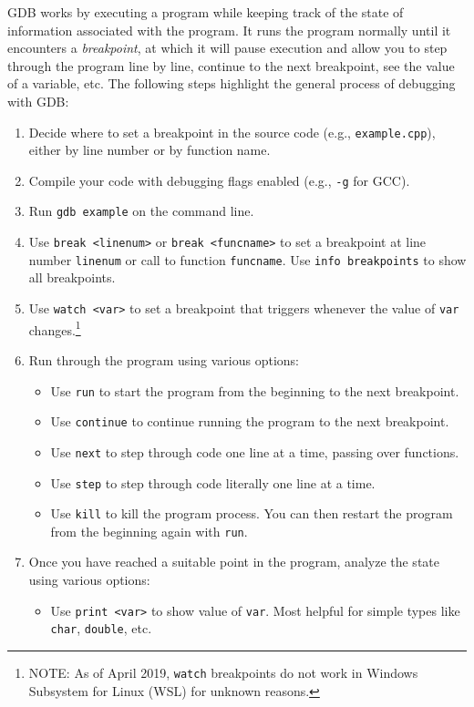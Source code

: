 \documentclass[12pt]{article}
\begin{document}
GDB works by executing a program while keeping track of the state of information associated with the program. It runs the program normally until it encounters a \emph{breakpoint}, at which it will pause execution and allow you to step through the program line by line, continue to the next breakpoint, see the value of a variable, etc. The following steps highlight the general process of debugging with GDB:
\begin{enumerate}
    \item Decide where to set a breakpoint in the source code (e.g., \texttt{example.cpp}), either by line number or by function name.
    \item Compile your code with debugging flags enabled (e.g., \texttt{-g} for GCC).
    \item Run \texttt{gdb example} on the command line.
    \item Use \texttt{break <linenum>} or \texttt{break <funcname>} to set a breakpoint at line number \texttt{linenum} or call to function \texttt{funcname}.  Use \texttt{info breakpoints} to show all breakpoints.
    \item Use \texttt{watch <var>} to set a breakpoint that triggers whenever the value of \texttt{var} changes.\footnote{NOTE: As of April 2019, \texttt{watch} breakpoints do not work in Windows Subsystem for Linux (WSL) for unknown reasons.}
    \item Run through the program using various options:
        \begin{itemize}
            \item Use \texttt{run} to start the program from the beginning to the next breakpoint.
            \item Use \texttt{continue} to continue running the program to the next breakpoint.
            \item Use \texttt{next} to step through code one line at a time, passing over functions.
            \item Use \texttt{step} to step through code literally one line at a time.
            \item Use \texttt{kill} to kill the program process. You can then restart the program from the beginning again with \texttt{run}.
        \end{itemize}
    \item Once you have reached a suitable point in the program, analyze the state using various options:
        \begin{itemize}
            \item Use \texttt{print <var>} to show value of \texttt{var}. Most helpful for simple types like \texttt{char}, \texttt{double}, etc.

\end{itemize}
\end{enumerate}
\end{document}
